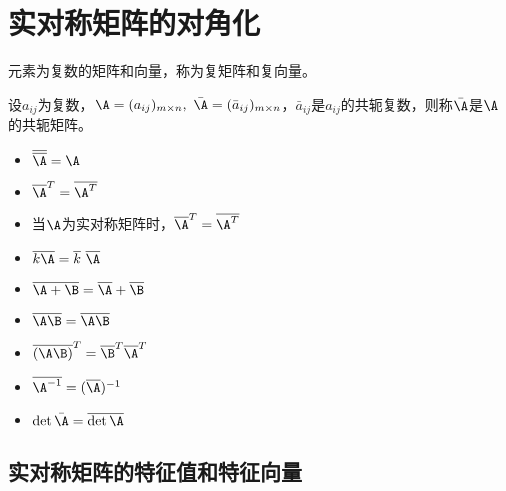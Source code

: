\section{实对称矩阵的对角化}



\begin{dingyi}
  元素为复数的矩阵和向量，称为复矩阵和复向量。
\end{dingyi}

\begin{dingyi}
  设$a_{ij}$为复数，$\A=(a_{ij})_{m\times n},~\bar\A=(\bar a_{ij})_{m\times n}$，$\bar a_{ij}$是$a_{ij}$的共轭复数，则称$\bar \A$是$\A$的共轭矩阵。
\end{dingyi}


\begin{itemize}
\item $\overline {\overline \A} = \A$
\item ${\overline \A}^T = \overline{\A^T}$
\item 当$\A$为实对称矩阵时，${\overline \A}^T = \overline{\A^T}$
\end{itemize}





\begin{itemize}
\item $\overline{k\A}=\overline k ~\overline \A$
\item $\overline{\A+\B}=\overline \A+\overline \B$
\item $\overline{\A\B}=\overline \A\overline \B$
\item $\overline{(\A\B)}^T=\overline \B^T \overline \A^T$
\item $\overline{\A^{-1}}=(\overline \A)^{-1}$
\item $\det \bar\A = \overline{\det \A}$
\end{itemize}



\subsection{实对称矩阵的特征值和特征向量}



